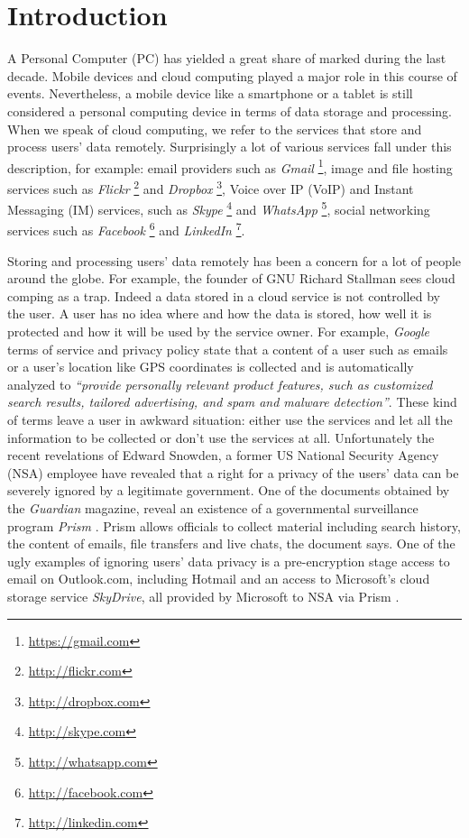 \section{Introduction}

A Personal Computer (PC) has yielded a great share of marked during the
last decade. Mobile devices and cloud computing played a major role in
this course of events. Nevertheless, a mobile device like a smartphone or a
tablet is still considered a personal computing device in terms of data
storage and processing. When we speak of cloud computing, we refer to
the services that store and process users' data remotely.
Surprisingly a lot of various services fall under this description,
for example: email providers such as
\emph{Gmail} \footnote{\url{https://gmail.com}},
image and file hosting services such as
\emph{Flickr} \footnote{\url{http://flickr.com}} and
\emph{Dropbox} \footnote{\url{http://dropbox.com}},
Voice over IP (VoIP) and Instant Messaging (IM) services, such as
\emph{Skype} \footnote{\url{http://skype.com}} and
\emph{WhatsApp} \footnote{\url{http://whatsapp.com}},
social networking services such as
\emph{Facebook} \footnote{\url{http://facebook.com}} and
\emph{LinkedIn} \footnote{\url{http://linkedin.com}}.


Storing and processing users' data remotely has been a concern for
a lot of people around the globe. For example, the founder of GNU
Richard Stallman sees cloud comping as a trap\cite{stallman-cloud-08}.
Indeed a data stored in a cloud service is not controlled by the user.
A user has no idea where and how the data is stored, how well it is
protected and how it will be used by the service owner.
For example, \emph{Google} terms of service\cite{google-tos} and
privacy policy\cite{google-privacy} state that a content of a user
such as emails or a user's location like GPS coordinates is collected
and is automatically analyzed to
\emph{``provide personally relevant product
features, such as customized search results, tailored advertising,
and spam and malware detection''}.
These kind of terms leave a user
in awkward situation: either use the services and let all the information
to be collected or don't use the services at all.
Unfortunately the recent revelations\cite{snowden-timeline}
of Edward Snowden, a former US National Security Agency (NSA) employee
have revealed that a right for a privacy of the users' data can be
severely ignored by a legitimate government.
One of the documents obtained by the \emph{Guardian} magazine,
reveal an existence of a governmental surveillance program \emph{Prism}
\cite{snowden-prism}. Prism allows officials to collect
material including search history, the content of emails, file
transfers and live chats, the document says. One of the ugly examples
of ignoring users' data privacy is a pre-encryption stage access
to email on Outlook.com, including Hotmail and an access to Microsoft's
cloud storage service \emph{SkyDrive}, all provided by Microsoft to NSA
via Prism \cite{snowden-ms-nsa}.

